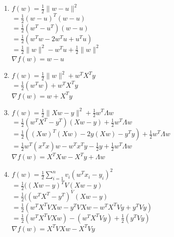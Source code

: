 \documentclass{article}
\def\norm#1{\|#1\|}
\begin{document}
\begin{enumerate}
     \item  $f(w) = \frac{1}{2}\norm{w-u}^2$\\
                      	$ = \frac{1}{2}(w-u)^T (w-u)$\\
                     	$ = \frac{1}{2}(w^T-u^T) (w-u)$\\
				$ = \frac{1}{2}(w^T w - 2w^T u + u^T u)$\\
                      	$= \frac{1}{2}\norm{w}^2 - w^T u +  \frac{1}{2}\norm{w}^2$\\
 				 $\nabla f(w) = w-u$ \\
               
    \item   $f(w) = \frac{1}{2}\norm{w}^2 + w^TX^Ty$\\
                   $ = \frac{1}{2}(w^T w) + w^TX^Ty$\\
			  $ \nabla f(w) =  w+ X^Ty$\\
   
      \item   $f(w)= \frac{1}{2}\norm{Xw - y}^2 + \frac{1}{2}w^T\Lambda w$\\
                 $= \frac{1}{2}(w^TX^T-y^T)(Xw-y) + \frac{1}{2}w^T\Lambda w$\\
			    $= \frac{1}{2}((Xw)^T(Xw)-2y(Xw)-y^Ty) + \frac{1}{2}w^T\Lambda w$\\
 			$= \frac{1}{2}w^T(x^Tx)w - w^Tx^Ty-  \frac{1}{2}y+ \frac{1}{2}w^T\Lambda w$\\
                 $ \nabla f(w) = X^TXw- X^Ty+\Lambda w$\\


        \item  $f(w) = \frac{1}{2}\sum_{i=1}^n v_i (w^Tx_i - y_i)^2$\\
                 $ = \frac{1}{2}( (Xw-y)^TV(Xw-y)$\\
                    $ = \frac{1}{2}( (w^TX^T-y^T)^V(Xw-y)$\\
                    $ = \frac{1}{2}(w^TX^TVXw - y^TVXw- w^TX^TVy+y^TVy)$\\
                     $ = \frac{1}{2}(w^TX^TVXw) -  (w^TX^TVy)+ \frac{1}{2}(y^TVy)$\\
  			$ \nabla f(w) = X^TVXw- X^TVy$\\

 
\end{enumerate}



\end{document}
